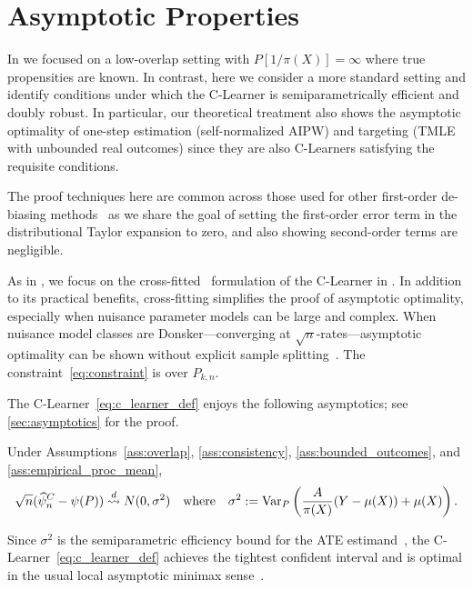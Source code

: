 \section{Asymptotic Properties}
\label{sec:theory_text}
In  we focused on a low-overlap setting with $P[1/\pi(X)]=\infty$ where true propensities are known. In contrast, here we consider a more standard setting and identify conditions under which  the C-Learner is semiparametrically efficient and doubly robust. In particular, our theoretical treatment also shows the asymptotic optimality of one-step estimation (self-normalized AIPW) and targeting (TMLE with unbounded real outcomes) since they are also C-Learners satisfying the requisite conditions. 

The proof techniques here are common across those used for other first-order de-biasing methods~\citep{van2006targeted,van2011targeted,van2016one,van2017generally,Kennedy22} as we share the goal of setting the first-order error term in the distributional Taylor expansion to zero, and also showing second-order terms are negligible. 


As in , we focus on the cross-fitted~\citep{van2011cross,ChernozhukovChDeDuHaNeRo18} formulation of the C-Learner in . %
In addition to its practical benefits,
cross-fitting simplifies the proof of  asymptotic optimality, especially when nuisance parameter models can be large and complex. When nuisance  model classes are Donsker---converging at $\sqrt{n}$-rates---asymptotic optimality can be shown without explicit sample splitting~\citep{Kennedy22,vaart2023empirical,van2000asymptotic}.
The constraint~\eqref{eq:constraint} is over $P_{k,n}$. %







 The C-Learner~\eqref{eq:c_learner_def} enjoys the following asymptotics; see \cref{sec:asymptotics} for the proof.
\begin{theorem}
\label{thm:asymp}
 Under Assumptions~\ref{ass:overlap}, \ref{ass:consistency}, 
 \ref{ass:bounded_outcomes}, and
\ref{ass:empirical_proc_mean},
 \begin{equation*}
    \sqrt{n} 
    (\widehat{\psi}_{n}^C - \psi(P))
    \stackrel{d}{\rightsquigarrow} N(0, \sigma^2)~~~\mbox{where}~~~
    \sigma^2 := 
    {\rm Var}_P\left( \frac{A}{\pi(X)}(Y - \mu(X))
    +\mu(X)
    \right).
 \end{equation*}
\end{theorem}
\vspace{-0.7em}
\noindent  Since $\sigma^2$ is the semiparametric efficiency bound for the ATE estimand~\cite{Tsiatis07,Kennedy22}, 
the C-Learner~\eqref{eq:c_learner_def}  achieves the tightest  confident interval  and is optimal in the usual local asymptotic minimax sense~\citep[Theorem 25.21]{van2000asymptotic}.
\vspace{-0.3em}
